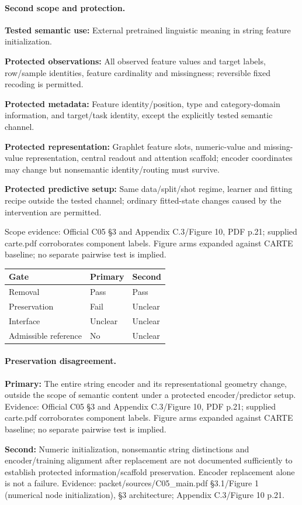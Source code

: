 \documentclass[10pt]{article}
\begin{document}
\paragraph{Second scope and protection.}
\textbf{Tested semantic use:} External pretrained linguistic meaning in string feature initialization.\par
\textbf{Protected observations:} All observed feature values and target labels, row/sample identities, feature cardinality and missingness; reversible fixed recoding is permitted.\par
\textbf{Protected metadata:} Feature identity/position, type and category-domain information, and target/task identity, except the explicitly tested semantic channel.\par
\textbf{Protected representation:} Graphlet feature slots, numeric-value and missing-value representation, central readout and attention scaffold; encoder coordinates may change but nonsemantic identity/routing must survive.\par
\textbf{Protected predictive setup:} Same data/split/shot regime, learner and fitting recipe outside the tested channel; ordinary fitted-state changes caused by the intervention are permitted.\par
Scope evidence: Official C05 §3 and Appendix C.3/Figure 10, PDF p.21; supplied carte.pdf corroborates component labels. Figure arms expanded against CARTE baseline; no separate pairwise test is implied.\par
\begin{tabular}{lll}\toprule Gate & Primary & Second \\ \midrule
Removal & Pass & Pass \\
Preservation & Fail & Unclear \\
Interface & Unclear & Unclear \\
Admissible reference & No & Unclear \\
\bottomrule\end{tabular}
\paragraph{Preservation disagreement.}
\textbf{Primary:} The entire string encoder and its representational geometry change, outside the scope of semantic content under a protected encoder/predictor setup. Evidence: Official C05 §3 and Appendix C.3/Figure 10, PDF p.21; supplied carte.pdf corroborates component labels. Figure arms expanded against CARTE baseline; no separate pairwise test is implied.\par
\textbf{Second:} Numeric initialization, nonsemantic string distinctions and encoder/training alignment after replacement are not documented sufficiently to establish protected information/scaffold preservation. Encoder replacement alone is not a failure. Evidence: packet/sources/C05\_main.pdf §3.1/Figure 1 (numerical node initialization), §3 architecture; Appendix C.3/Figure 10 p.21.\par
\end{document}
